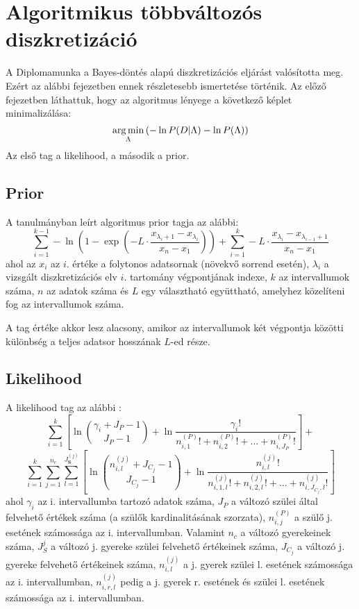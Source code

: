 \chapter{Algoritmikus többváltozós diszkretizáció}
\label{chapter:bayesdontesalapu}
A Diplomamunka a Bayes-döntés alapú diszkretizációs eljárást valósította meg. Ezért az alábbi fejezetben ennek részletesebb ismertetése történik. Az előző fejezetben láthattuk, hogy az algoritmus lényege a következő képlet minimalizálása:
$$ \mathop{\mathrm{arg\,min}}_{\Lambda}{(-\ln{P(D | \Lambda)} - \ln{P(\Lambda)})}$$
Az első tag a likelihood, a második a prior.

\section{Prior}
A tanulmányban \cite{chen2017learning} leírt algoritmus prior tagja az alábbi:
$$\sum_{i=1}^{k-1} -\ln{(1-\exp{(
-L \cdot \frac{x_{\lambda_i+1}-x_{\lambda_i}}{x_{n}-x_{1}})})} +
\sum_{i=1}^{k}
-L \cdot \frac{x_{\lambda_i}-x_{\lambda_{i-1}+1}}{x_{n}-x_{1}}$$
ahol az $x_i$ az $i$. értéke a folytonos adatsornak (növekvő sorrend esetén), $\lambda_i$ a vizsgált diszkretizációs elv $i$. tartomány végpontjának indexe, $k$ az intervallumok száma, $n$ az adatok száma és $L$ egy választható együttható, amelyhez közelíteni fog az intervallumok száma.

A tag értéke akkor lesz alacsony, amikor az intervallumok két végpontja közötti különbség a teljes adatsor hosszának $L$-ed része.

\section{Likelihood}
A likelihood tag az alábbi \cite{boulle2006modl}:
$$
\sum_{i = 1}^{k} \left[ \ln \binom{\gamma_i+J_P-1}{J_P-1} + \ln \frac{\gamma_i!}{n_{i,1}^{(P)}! + n_{i,2}^{(P)}! + \dotsc + n_{i,J_P}^{(P)}!}\right] +
$$
$$
\sum_{i = 1}^{k}\sum_{j=1}^{n_c} \sum_{l=1}^{J_\textbf{S}^{(j)}} \left[ \ln \binom{n_{i,l}^{(j)}+J_{C_j}-1}{J_{C_j}-1} + \ln \frac{n_{i,l}^{(j)}!} {n_{i,1,l}^{(j)}! + n_{i,2,l}^{(j)}! + \dotsc + n_{i,J_{C_j},l}^{(j)}!}  \right]
$$
ahol $\gamma_i$ az i. intervallumba tartozó adatok száma, $J_P$ a változó szülei által felvehető értékek száma (a szülők kardinalitásának szorzata), $n_{i,j}^{(P)}$ a szülő j. esetének számossága az i. intervallumban.
Valamint $n_c$ a változó gyerekeinek száma, $J_S^{j}$ a változó j. gyereke szülei felvehető értékeinek száma, $J_{C_j}$ a változó j. gyereke felvehető értékeinek száma, $n_{i,l}^{(j)}$ a j. gyerek szülei l. esetének számossága az i. intervallumban, $n_{i,r,l}^{(j)}$ pedig a j. gyerek r. esetének és szülei l. esetének számossága az i. intervallumban.

